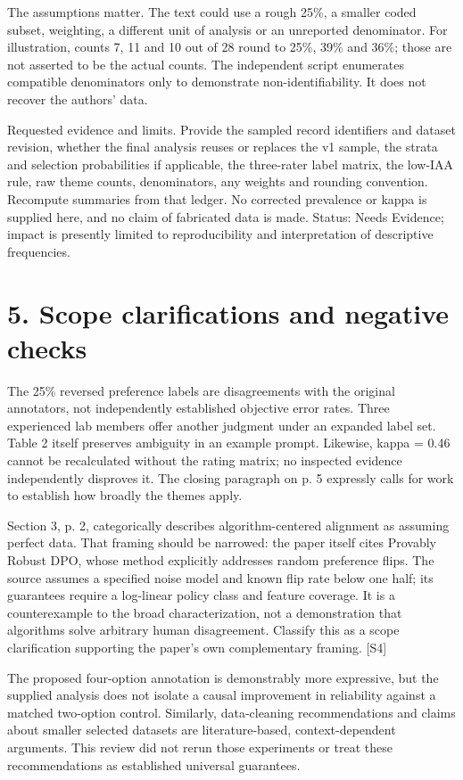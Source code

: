 \documentclass[10pt]{article}
\begin{document}
The assumptions matter. The text could use a rough 25\%, a smaller coded subset, weighting, a different unit of analysis or an unreported denominator. For illustration, counts 7, 11 and 10 out of 28 round to 25\%, 39\% and 36\%; those are not asserted to be the actual counts. The independent script enumerates compatible denominators only to demonstrate non-identifiability. It does not recover the authors’ data.\par
Requested evidence and limits. Provide the sampled record identifiers and dataset revision, whether the final analysis reuses or replaces the v1 sample, the strata and selection probabilities if applicable, the three-rater label matrix, the low-IAA rule, raw theme counts, denominators, any weights and rounding convention. Recompute summaries from that ledger. No corrected prevalence or kappa is supplied here, and no claim of fabricated data is made. Status: Needs Evidence; impact is presently limited to reproducibility and interpretation of descriptive frequencies.\par
\section*{5. Scope clarifications and negative checks}
The 25\% reversed preference labels are disagreements with the original annotators, not independently established objective error rates. Three experienced lab members offer another judgment under an expanded label set. Table 2 itself preserves ambiguity in an example prompt. Likewise, kappa = 0.46 cannot be recalculated without the rating matrix; no inspected evidence independently disproves it. The closing paragraph on p. 5 expressly calls for work to establish how broadly the themes apply.\par
Section 3, p. 2, categorically describes algorithm-centered alignment as assuming perfect data. That framing should be narrowed: the paper itself cites Provably Robust DPO, whose method explicitly addresses random preference flips. The source assumes a specified noise model and known flip rate below one half; its guarantees require a log-linear policy class and feature coverage. It is a counterexample to the broad characterization, not a demonstration that algorithms solve arbitrary human disagreement. Classify this as a scope clarification supporting the paper’s own complementary framing. [S4]\par
The proposed four-option annotation is demonstrably more expressive, but the supplied analysis does not isolate a causal improvement in reliability against a matched two-option control. Similarly, data-cleaning recommendations and claims about smaller selected datasets are literature-based, context-dependent arguments. This review did not rerun those experiments or treat these recommendations as established universal guarantees.\par
\end{document}
